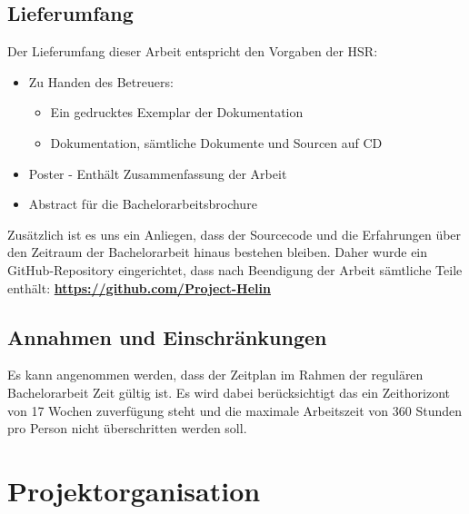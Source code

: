 \subsection{Lieferumfang}
Der Lieferumfang dieser Arbeit entspricht den Vorgaben der HSR:
\begin{itemize}
	\item{Zu Handen des Betreuers:
	\begin{itemize}
		\item{Ein gedrucktes Exemplar der Dokumentation}
		\item{Dokumentation, sämtliche Dokumente und Sourcen auf CD}
	\end{itemize}}
	\item{Poster - Enthält Zusammenfassung der Arbeit}
	\item{Abstract für die Bachelorarbeitsbrochure}
\end{itemize}
Zusätzlich ist es uns ein Anliegen, dass der Sourcecode und die Erfahrungen über den Zeitraum der Bachelorarbeit hinaus bestehen bleiben. Daher wurde ein GitHub-Repository eingerichtet, dass nach Beendigung der Arbeit sämtliche Teile enthält: \textbf{\url{https://github.com/Project-Helin}}

\subsection{Annahmen und Einschränkungen}
Es kann angenommen werden, dass der Zeitplan im Rahmen der regulären Bachelorarbeit Zeit gültig ist. Es wird dabei berücksichtigt das ein Zeithorizont von 17 Wochen zuverfügung steht und die maximale Arbeitszeit von 360 Stunden pro Person nicht überschritten werden soll.

\newpage

\section{Projektorganisation}
